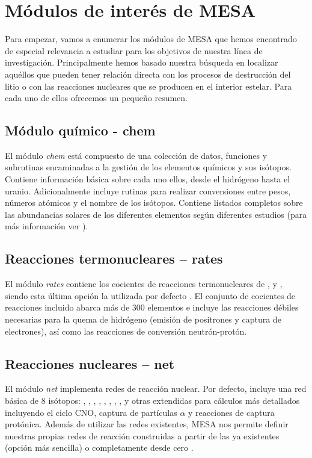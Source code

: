 \section{Módulos de interés de MESA}
Para empezar, vamos a enumerar los módulos de MESA que hemos encontrado de especial relevancia a estudiar para los objetivos de nuestra línea de investigación. Principalmente hemos basado nuestra búsqueda en localizar aquéllos que pueden tener relación directa con los procesos de destrucción del litio o con las reacciones nucleares que se producen en el interior estelar. Para cada uno de ellos ofrecemos un pequeño resumen.

\subsection{Módulo químico - chem}
El módulo \textit{chem} está compuesto de una colección de datos, funciones y subrutinas encaminadas a la gestión de los elementos químicos y sus isótopos. Contiene información básica sobre cada uno ellos, desde el hidrógeno hasta el uranio. Adicionalmente incluye rutinas para realizar conversiones entre pesos, números atómicos y el nombre de los isótopos. Contiene listados completos sobre las abundancias solares de los diferentes elementos según diferentes estudios (para más información ver \cite{Paxton2011}).\par

\subsection{Reacciones termonucleares – rates}
El módulo \textit{rates} contiene los cocientes de reacciones termonucleares de \cite{Caughlan1988}, y \cite{Angulo1999}, siendo esta última opción la utilizada por defecto \citep{Paxton2011}. El conjunto de cocientes de reacciones incluido abarca más de 300 elementos e incluye las reacciones débiles necesarias para la quema de hidrógeno (emisión de positrones y captura de electrones), así como las reacciones de conversión neutrón-protón.

\subsection{Reacciones nucleares – net} \label{reac_nuc}
El módulo \textit{net} implementa redes de reacción nuclear. Por defecto, incluye una red básica de 8 isótopos: , , , , , , , , y otras extendidas para cálculos más detallados incluyendo el ciclo CNO, captura de partículas $\alpha$ y reacciones de captura protónica. Además de utilizar las redes existentes, MESA nos permite definir nuestras propias redes de reacción construidas a partir de las ya existentes (opción más sencilla) o completamente desde cero \citep{Paxton2011}.\par

